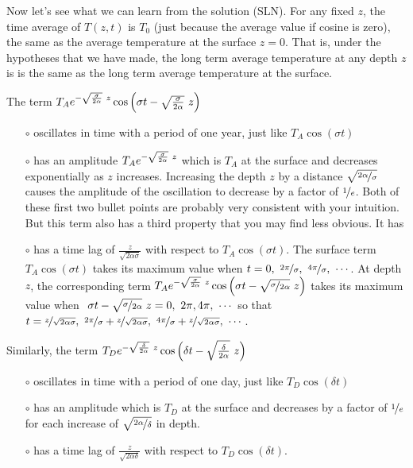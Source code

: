 Now let's see what we can learn from the solution (SLN).
For any fixed $z$, the time average of $T(z,t)$ is $T_0$ (just because the average
value if cosine is zero), the same as the average temperature
at the surface $z=0$. That is, under the hypotheses that we have made,
the long term average temperature at any depth $z$ is is the same as 
the long term average temperature at the surface.

The term 
$T_Ae^{-\sqrt{\sigma \over 2\alpha}\ z}
           \cos\Big(\sigma t-\sqrt{\frac{\sigma }{2\alpha}}\   z\Big)$
\begin{itemize}\itemsep1pt \parskip5pt  %
\item[$\circ$] 
oscillates in time with a period of one year, just like $T_A\cos(\sigma t)$
\item[$\circ$]
has an amplitude $T_Ae^{-\sqrt{\sigma \over 2\alpha}\ z}$ which
is $T_A$ at the surface and decreases exponentially as $z$ increases. 
Increasing the depth $z$ by a distance $\sqrt{\nicefrac{2\alpha}{\sigma}}$ 
causes the amplitude of the oscillation to decrease by a factor 
of $\nicefrac{1}{e}$. Both of these first two bullet points are probably
very consistent with your intuition. But this term also has a third property
that you may find less obvious. It has 
\item[$\circ$]
has a time lag of $\frac{z}{\sqrt{2\alpha\sigma}}$ with respect to 
$T_A\cos(\sigma t)$.
The surface term $T_A\cos(\sigma t)$ takes its maximum value when
$t=0,\ \nicefrac{2\pi}{\sigma},\ \nicefrac{4\pi}{\sigma},\ \cdots$. 
At depth $z$, the corresponding term $T_Ae^{-\sqrt{\sigma \over 2\alpha}\ z}
         \cos\Big(\sigma t-\sqrt{\nicefrac{\sigma }{2\alpha}}\ z\Big)$
takes its maximum value when $\ \sigma t-\sqrt{\nicefrac{\sigma }{2\alpha}}\ z
        =0,\ 2\pi, 4\pi,\ \cdots$ so that
$t=\nicefrac{z}{\sqrt{2\alpha\sigma}},\ \nicefrac{2\pi}{\sigma}+\nicefrac{z}{\sqrt{2\alpha\sigma}},
\ \nicefrac{4\pi}{\sigma}+\nicefrac{z}{\sqrt{2\alpha\sigma}},\ \cdots$.
\end{itemize}
Similarly, the term 
$T_De^{-\sqrt{\delta \over 2\alpha}\ z}
          \cos\Big(\delta t-\sqrt{\frac{\delta }{2\alpha}}\ z\Big)$
\begin{itemize}\itemsep1pt \parskip5pt  %
\item[$\circ$] 
oscillates in time with a period of one day, just like $T_D\cos(\delta t)$
\item[$\circ$]
has an amplitude which is $T_D$ at the surface and decreases by a 
factor of $\nicefrac{1}{e}$ for each increase of 
$\sqrt{\nicefrac{2\alpha}{\delta}}$  in depth.
\item[$\circ$]
has a time lag of $\frac{z}{\sqrt{2\alpha\delta}}$ with respect to 
$T_D\cos(\delta t)$.
\end{itemize}
